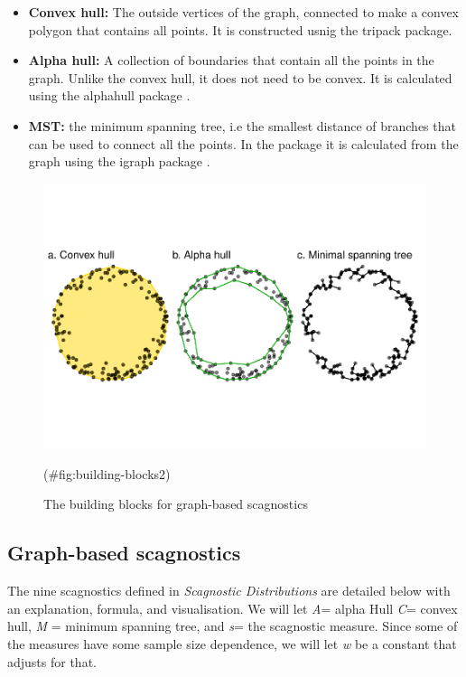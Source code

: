 \begin{itemize}
\item
  \textbf{Convex hull:} The outside vertices of the graph, connected to
  make a convex polygon that contains all points. It is constructed
  usnig the tripack package.
\item
  \textbf{Alpha hull:} A collection of boundaries that contain all the
  points in the graph. Unlike the convex hull, it does not need to be
  convex. It is calculated using the alphahull package
  \citep{alphahull}.
\item
  \textbf{MST:} the minimum spanning tree, i.e the smallest distance of
  branches that can be used to connect all the points. In the package it
  is calculated from the graph using the igraph package \citep{igraph}.
\end{itemize}

\begin{Schunk}
\begin{figure}
\includegraphics[width=1\linewidth]{mason-lee-laa-cook_files/figure-latex/building-blocks2-1} \caption[The building blocks for graph-based scagnostics]{The building blocks for graph-based scagnostics}(\#fig:building-blocks2)
\end{figure}
\end{Schunk}

\hypertarget{graph-based-scagnostics}{%
\subsection{Graph-based scagnostics}\label{graph-based-scagnostics}}

The nine scagnostics defined in \emph{Scagnostic Distributions} are
detailed below with an explanation, formula, and visualisation. We will
let \emph{A}= alpha Hull \emph{C}= convex hull, \emph{M} = minimum
spanning tree, and \emph{s}= the scagnostic measure. Since some of the
measures have some sample size dependence, we will let \emph{w} be a
constant that adjusts for that.

